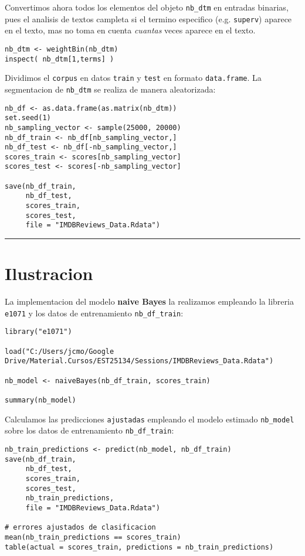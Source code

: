 \documentclass[11pt,]{article}
\begin{document}
Convertimos ahora todos los elementos del objeto \texttt{nb\_dtm} en
entradas binarias, pues el analisis de textos campleta si el termino
especifico (e.g. \texttt{superv}) aparece en el texto, mas no toma en
cuenta \emph{cuantas} veces aparece en el texto.

\begin{verbatim}
nb_dtm <- weightBin(nb_dtm)
inspect( nb_dtm[1,terms] )
\end{verbatim}

Dividimos el \texttt{corpus} en datos \texttt{train} y \texttt{test} en
formato \texttt{data.frame}. La segmentacion de \texttt{nb\_dtm} se
realiza de manera aleatorizada:

\begin{verbatim}
nb_df <- as.data.frame(as.matrix(nb_dtm))
set.seed(1)
nb_sampling_vector <- sample(25000, 20000)
nb_df_train <- nb_df[nb_sampling_vector,]
nb_df_test <- nb_df[-nb_sampling_vector,]
scores_train <- scores[nb_sampling_vector]
scores_test <- scores[-nb_sampling_vector]

save(nb_df_train, 
     nb_df_test, 
     scores_train, 
     scores_test, 
     file = "IMDBReviews_Data.Rdata")
\end{verbatim}

\begin{center}\rule{0.5\linewidth}{\linethickness}\end{center}

\section{Ilustracion}\label{ilustracion}

La implementacion del modelo \textbf{naive Bayes} la realizamos
empleando la libreria \texttt{e1071} y los datos de entrenamiento
\texttt{nb\_df\_train}:

\begin{verbatim}
library("e1071")

load("C:/Users/jcmo/Google Drive/Material.Cursos/EST25134/Sessions/IMDBReviews_Data.Rdata")

nb_model <- naiveBayes(nb_df_train, scores_train)

summary(nb_model)
\end{verbatim}

Calculamos las predicciones \texttt{ajustadas} empleando el modelo
estimado \texttt{nb\_model} sobre los datos de entrenamiento
\texttt{nb\_df\_train}:

\begin{verbatim}
nb_train_predictions <- predict(nb_model, nb_df_train) 
save(nb_df_train, 
     nb_df_test, 
     scores_train, 
     scores_test, 
     nb_train_predictions, 
     file = "IMDBReviews_Data.Rdata")

# errores ajustados de clasificacion
mean(nb_train_predictions == scores_train)
table(actual = scores_train, predictions = nb_train_predictions)
\end{verbatim}
\end{document}
